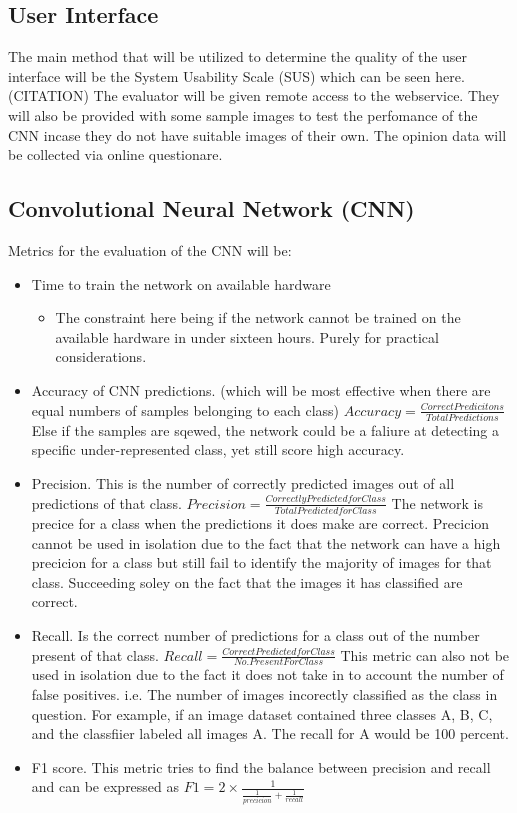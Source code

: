   \subsection{User Interface}
  The main method that will be utilized to determine the quality of the user interface will be the System Usability Scale (SUS) which can be seen here. (CITATION) %
  The evaluator will be given remote access to the webservice. They will also be provided with some sample images to test the perfomance of the CNN incase they do not have suitable images of their own.
  The opinion data will be collected via online questionare.
  \subsection{Convolutional Neural Network (CNN)}
  Metrics for the evaluation of the CNN will be:
  \begin{itemize}
    \item Time to train the network on available hardware
    \begin{itemize}
      \item The constraint here being if the network cannot be trained on the available hardware in under sixteen hours. Purely for practical considerations.
    \end{itemize}
    \item Accuracy of CNN predictions. (which will be most effective when there are equal numbers of samples belonging to each class) $Accuracy = \frac{Correct Predicitons}{Total Predictions}$ Else if the samples are sqewed, the network could be a faliure at detecting a specific under-represented class, yet still score high accuracy.
    \item Precision. This is the number of correctly predicted images out of all predictions of that class. $Precision = \frac{Correctly Predicted for Class}{Total Predicted for Class}$ The network is precice for a class when the predictions it does make are correct. Precicion cannot be used in isolation due to the fact that the network can have a high precicion for a class but still fail to identify the majority of images for that class. Succeeding soley on the fact that the images it has classified are correct.
    \item Recall. Is the correct number of predictions for a class out of the number present of that class. $Recall = \frac{Correct Predicted for Class}{No. Present For Class}$
    This metric can also not be used in isolation due to the fact it does not take in to account the number of false positives. i.e. The number of images incorectly classified as the class in question. For example, if an image dataset contained three classes A, B, C, and the classfiier labeled all images A. The recall for A would be 100 percent.
    \item F1 score. This metric tries to find the balance between precision and recall and can be expressed as $F1 = 2 \times \frac{1}{\frac{1}{precicion} + \frac{1}{recall}}$
  \end{itemize}
